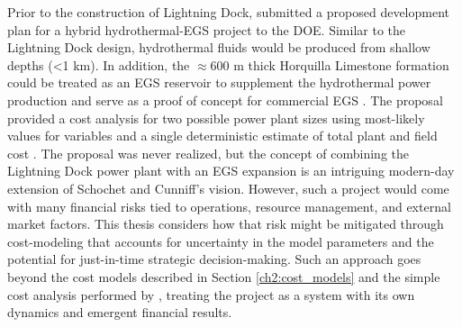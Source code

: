 Prior to the construction of Lightning Dock, \citet{schochet_development_2001} submitted a proposed development plan for a hybrid hydrothermal-EGS project to the DOE. Similar to the Lightning Dock design, hydrothermal fluids would be produced from shallow depths (<1 km). In addition, the $\approx$600 m thick Horquilla Limestone formation could be treated as an EGS reservoir to supplement the hydrothermal power production and serve as a proof of concept for commercial EGS \citep{schochet_development_2001}. The proposal provided a cost analysis for two possible power plant sizes using most-likely values for variables and a single deterministic estimate of total plant and field cost \citep[Table 3,][]{schochet_development_2001}. The proposal was never realized, but the concept of combining the Lightning Dock power plant with an EGS expansion is an intriguing modern-day extension of Schochet and Cunniff’s vision. However, such a project would come with many financial risks tied to operations, resource management, and external market factors. This thesis considers how that risk might be mitigated through cost-modeling that accounts for uncertainty in the model parameters and the potential for just-in-time strategic decision-making. Such an approach goes beyond the cost models described in Section \ref{ch2:cost_models} and the simple cost analysis performed by \citet{schochet_development_2001}, treating the project as a system with its own dynamics and emergent financial results.

